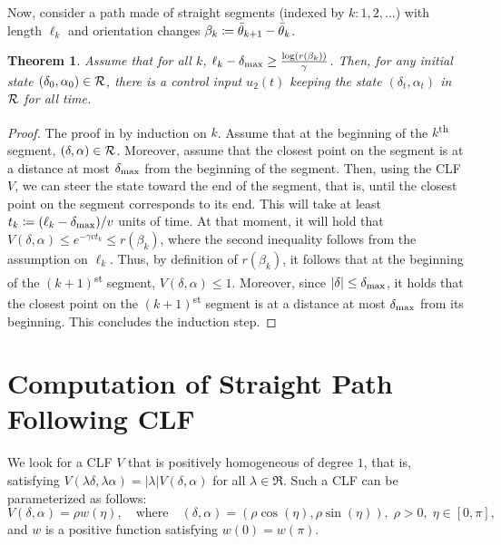 \documentclass{article}
\theoremstyle{plain}
\newtheorem{theorem}{Theorem}
\theoremstyle{definition}
\theoremstyle{remark}
\newcommand{\deltamax}{\delta_\maxtxt}
\begin{document}
Now, consider a path made of straight segments (indexed by $k:1,2,\ldots$) with length $\ell_k$
and orientation changes $\beta_k\coloneqq\bar{\theta}_{k+1}-\bar{\theta}_k$.

\begin{theorem}\label{thm-nonsmooth-safety}
Assume that for all $k$, $\ell_k-\deltamax\geq\frac{\log(r(\beta_k))}\gamma$.
Then, for any initial state $(\delta_0,\alpha_0)\in\mathcal{R}$,
there is a control input $u_2(t)$ keeping the state $(\delta_t,\alpha_t)$ in $\mathcal{R}$ for all time.
\end{theorem}

\begin{proof}
The proof in by induction on $k$.
Assume that at the beginning of the $k$\textsuperscript{th} segment,
$(\delta,\alpha)\in\mathcal{R}$.
Moreover, assume that the closest point on the segment is at a distance
at most $\deltamax$ from the beginning of the segment.
Then, using the CLF $V$, we can steer the state toward the end of the segment,
that is, until the closest point on the segment corresponds to its end.
This will take at least $t_k\coloneqq(\ell_k-\deltamax)/v$ units of time.
At that moment, it will hold that $V(\delta,\alpha)\leq e^{-\gamma vt_k}\leq r(\beta_k)$,
where the second inequality follows from the assumption on $\ell_k$.
Thus, by definition of $r(\beta_k)$, it follows that at the beginning of
the $(k+1)$\textsuperscript{st} segment, $V(\delta,\alpha)\leq1$.
Moreover, since $\lvert\delta\rvert\leq\deltamax$, it holds that the closest point
on the $(k+1)$\textsuperscript{st} segment is at a distance at most $\deltamax$
from its beginning.
This concludes the induction step.
\end{proof}

\section{Computation of Straight Path Following CLF}\label{sec-computation}

We look for a CLF $V$ that is positively homogeneous of degree $1$,
that is, satisfying $V(\lambda\delta,\lambda\alpha)=\lvert\lambda\rvert V(\delta,\alpha)$
for all $\lambda\in\Re$.
Such a CLF can be parameterized as follows:
\begin{equation}\label{eq-clf-homogeneous}
V(\delta,\alpha) = \rho w(\eta), \quad\text{where}\quad (\delta,\alpha)=(\rho\cos(\eta),\rho\sin(\eta)), \; \rho>0, \; \eta\in[0,\pi],
\end{equation}
and $w$ is a positive function satisfying $w(0)=w(\pi)$.
\end{document}
